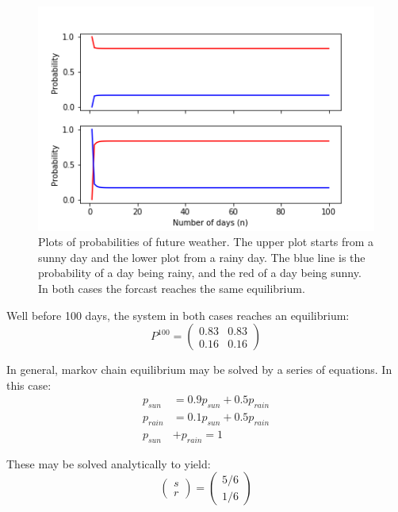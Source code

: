 \documentclass[twocolumn]{article}
\begin{document}
\begin{figure}
\centering
\includegraphics[width=\linewidth]{fig13}
\caption{Plots of probabilities of future weather. The upper plot starts from a sunny day and the lower plot from a rainy day. The blue line is the probability of a day being rainy, and the red of a day being sunny. In both cases the forcast reaches the same equilibrium.}
\label{fig:fig13}
\end{figure}

Well before 100 days, the system in both cases reaches an equilibrium:
\[ P^{100} = \begin{pmatrix}
0.83 & 0.83 \\
0.16 & 0.16
\end{pmatrix} \]

In general, markov chain equilibrium may be solved by a series of equations. In this case:
\begin{equation}
\begin{split}
p_{sun} &= 0.9 p_{sun} + 0.5 p_{rain} \\
p_{rain} &= 0.1 p_{sun} + 0.5 p_{rain} \\
p_{sun} &+ p_{rain} = 1
\end{split}
\end{equation}

These may be solved analytically to yield:
\begin{equation}
\begin{pmatrix} s \\ r \end{pmatrix}
= \begin{pmatrix} 5/6 \\ 1/6 \end{pmatrix}
\end{equation}
\end{document}
